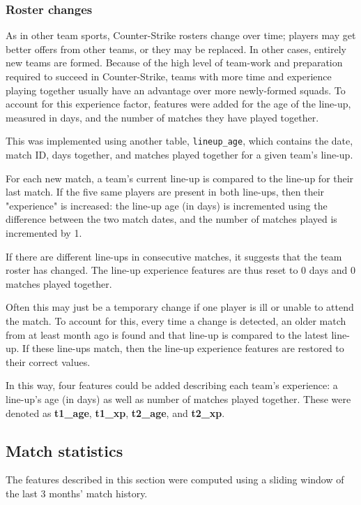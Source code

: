 \subsubsection{Roster changes}

As in other team sports, Counter-Strike rosters change over time; players may get better offers from other teams, or they may be replaced. In other cases, entirely new teams are formed. Because of the high level of team-work and preparation required to succeed in Counter-Strike, teams with more time and experience playing together usually have an advantage over more newly-formed squads. To account for this experience factor, features were added for the age of the line-up, measured in days, and the number of matches they have played together.

This was implemented using another table, \texttt{lineup\_age}, which contains the date, match ID, days together, and matches played together for a given team's line-up. 

For each new match, a team's current line-up is compared to the line-up for their last match. If the five same players are present in both line-ups, then their "experience" is increased: the line-up age (in days) is incremented using the difference between the two match dates, and the number of matches played is incremented by 1.

If there are different line-ups in consecutive matches, it suggests that the team roster has changed. The line-up experience features are thus reset to 0 days and 0 matches played together.

Often this may just be a temporary change if one player is ill or unable to attend the match. To account for this, every time a change is detected, an older match from at least month ago is found and that line-up is compared to the latest line-up. If these line-ups match, then the line-up experience features are restored to their correct values.

In this way, four features could be added describing each team's experience: a line-up's age (in days) as well as number of matches played together. These were denoted as \textbf{t1\_age}, \textbf{t1\_xp}, \textbf{t2\_age}, and \textbf{t2\_xp}.

\subsection{Match statistics}

The features described in this section were computed using a sliding window of the last 3 months' match history.

